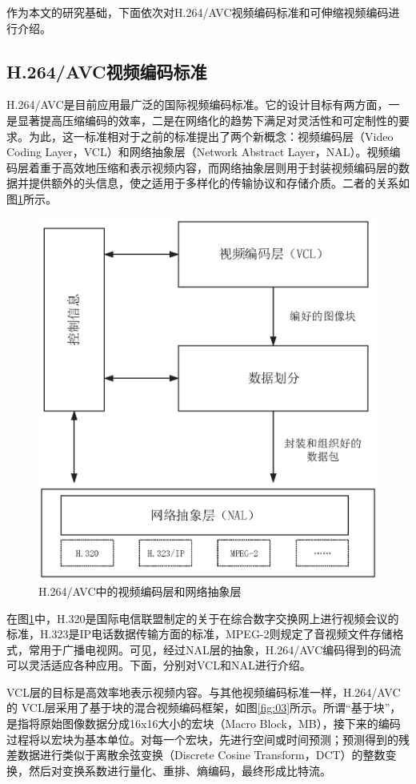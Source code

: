 作为本文的研究基础，下面依次对H.264/AVC视频编码标准和可伸缩视频编码进行介绍。

\subsection{H.264/AVC视频编码标准}

H.264/AVC是目前应用最广泛的国际视频编码标准。它的设计目标有两方面，一是显著提高压缩编码的效率，二是在网络化的趋势下满足对灵活性和可定制性的要求。为此，这一标准相对于之前的标准提出了两个新概念：视频编码层（Video Coding Layer，VCL）和网络抽象层（Network Abstract Layer，NAL）。视频编码层着重于高效地压缩和表示视频内容，而网络抽象层则用于封装视频编码层的数据并提供额外的头信息，使之适用于多样化的传输协议和存储介质。二者的关系如图\ref{fig:AVC-design}所示。

\begin{figure}[h]
	\centering
	\includegraphics[width = 0.8\linewidth]{eps/AVC-design}
	\caption{H.264/AVC中的视频编码层和网络抽象层\label{fig:AVC-design}}
\end{figure}

在图\ref{fig:AVC-design}中，H.320是国际电信联盟制定的关于在综合数字交换网上进行视频会议的标准，H.323是IP电话数据传输方面的标准，MPEG-2则规定了音视频文件存储格式，常用于广播电视网。可见，经过NAL层的抽象，H.264/AVC编码得到的码流可以灵活适应各种应用。下面，分别对VCL和NAL进行介绍。

VCL层的目标是高效率地表示视频内容。与其他视频编码标准一样，H.264/AVC的
VCL层采用了基于块的混合视频编码框架，如图\ref{fig:03}\supercite{H.264-Overview}所示。所谓“基于块”，是指将原始图像数据分成16x16大小的宏块（Macro Block，MB），接下来的编码过程将以宏块为基本单位。对每一个宏块，先进行空间或时间预测；预测得到的残差数据进行类似于离散余弦变换（Discrete Cosine Transform，DCT）的整数变换，然后对变换系数进行量化、重排、熵编码，最终形成比特流。

